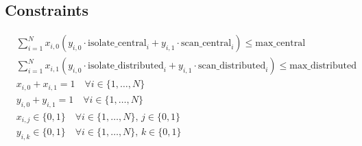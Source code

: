 \documentclass{article}
\begin{document}
\subsection*{Constraints}
\begin{align*}
& \sum_{i=1}^{N} x_{i,0} \left(y_{i,0} \cdot \text{isolate\_central}_i + y_{i,1} \cdot \text{scan\_central}_i\right) \leq \text{max\_central} \\
& \sum_{i=1}^{N} x_{i,1} \left(y_{i,0} \cdot \text{isolate\_distributed}_i + y_{i,1} \cdot \text{scan\_distributed}_i\right) \leq \text{max\_distributed} \\
& x_{i,0} + x_{i,1} = 1 \quad \forall i \in \{1, \ldots, N\} \\
& y_{i,0} + y_{i,1} = 1 \quad \forall i \in \{1, \ldots, N\} \\
& x_{i,j} \in \{0, 1\} \quad \forall i \in \{1, \ldots, N\}, \, j \in \{0, 1\} \\
& y_{i,k} \in \{0, 1\} \quad \forall i \in \{1, \ldots, N\}, \, k \in \{0, 1\}
\end{align*}
\end{document}
